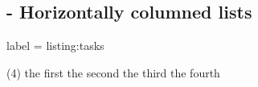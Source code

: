 
\subsection{ - Horizontally columned lists}

\begin{tcblisting}{label = listing:tasks}
  \begin{tasks}(4)
    \task the first
    \task the second
    \task the third
    \task the fourth
  \end{tasks}
\end{tcblisting}
